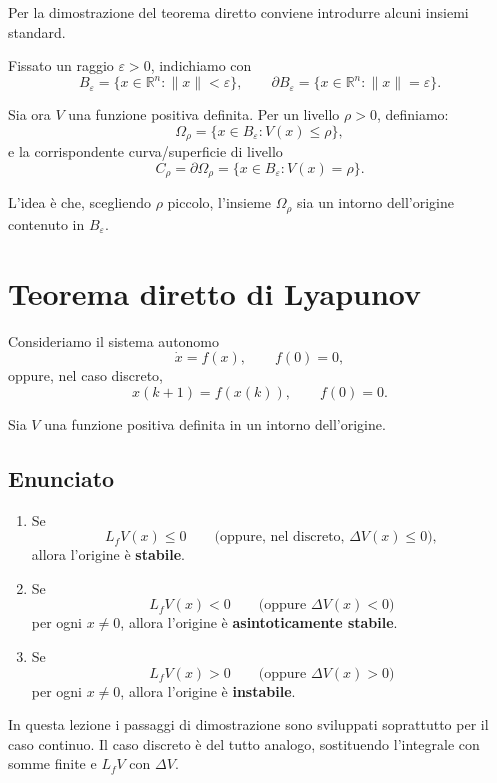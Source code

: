 Per la dimostrazione del teorema diretto conviene introdurre alcuni insiemi standard.

Fissato un raggio \(\varepsilon>0\), indichiamo con
\[
B_\varepsilon=\{x\in\mathbb{R}^n:\|x\|<\varepsilon\},
\qquad
\partial B_\varepsilon=\{x\in\mathbb{R}^n:\|x\|=\varepsilon\}.
\]

Sia ora \(V\) una funzione positiva definita. Per un livello \(\rho>0\), definiamo:
\[
\Omega_\rho=\{x\in B_\varepsilon : V(x)\le \rho\},
\]
e la corrispondente curva/superficie di livello
\[
C_\rho=\partial\Omega_\rho
=
\{x\in B_\varepsilon : V(x)=\rho\}.
\]

\medskip

\noindent
L'idea è che, scegliendo \(\rho\) piccolo, l'insieme \(\Omega_\rho\) sia un intorno dell'origine contenuto in \(B_\varepsilon\).

\section{Teorema diretto di Lyapunov}

Consideriamo il sistema autonomo
\[
\dot x=f(x),
\qquad
f(0)=0,
\]
oppure, nel caso discreto,
\[
x(k+1)=f(x(k)),
\qquad
f(0)=0.
\]

Sia \(V\) una funzione positiva definita in un intorno dell'origine.

\subsection*{Enunciato}

\begin{enumerate}
    \item Se
    \[
    L_fV(x)\le 0
    \qquad
    \text{(oppure, nel discreto, } \Delta V(x)\le 0\text{)},
    \]
    allora l'origine è \textbf{stabile}.

    \item Se
    \[
    L_fV(x)<0
    \qquad
    \text{(oppure } \Delta V(x)<0\text{)}
    \]
    per ogni \(x\neq 0\), allora l'origine è \textbf{asintoticamente stabile}.

    \item Se
    \[
    L_fV(x)>0
    \qquad
    \text{(oppure } \Delta V(x)>0\text{)}
    \]
    per ogni \(x\neq 0\), allora l'origine è \textbf{instabile}.
\end{enumerate}

\medskip

\noindent
In questa lezione i passaggi di dimostrazione sono sviluppati soprattutto per il caso continuo. Il caso discreto è del tutto analogo, sostituendo l'integrale con somme finite e \(L_fV\) con \(\Delta V\).

